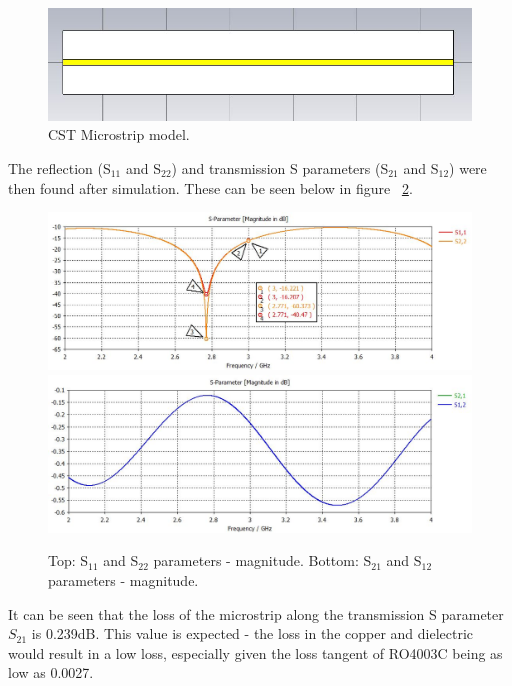 \documentclass{paper}
\begin{document}
\begin{figure}[H]
	\centering
	\includegraphics[scale=0.5]{IMG/CSTStripline}
	\caption{CST Microstrip model.}
	\label{fig:stripline1}
\end{figure}

The reflection (S$_{11}$ and S$_{22}$) and transmission S parameters (S$_{21}$ and S$_{12}$) were then found after simulation. These can be seen below in figure ~\ref{fig:s11_s22_s21_s12}.

\begin{figure}[H]
	\centering
	\includegraphics[scale=0.4]{IMG/S11_and_S22}
	\includegraphics[scale=0.4]{IMG/S21_and_S12}
	\caption{Top: S$_{11}$ and S$_{22}$ parameters - magnitude. Bottom: S$_{21}$ and S$_{12}$ parameters - magnitude.}
	\label{fig:s11_s22_s21_s12}
\end{figure}

It can be seen that the loss of the microstrip along the transmission S parameter $S_{21}$ is 0.239dB. This value is expected - the loss in the copper and dielectric would result in a low loss, especially given the loss tangent of RO4003C being as low as 0.0027.\\
\end{document}
